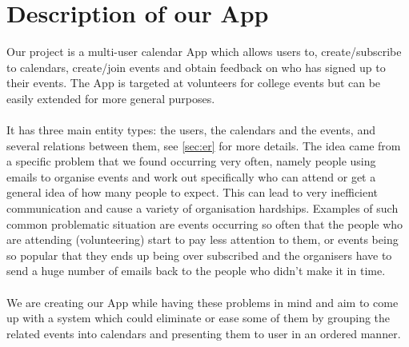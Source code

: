 \documentclass[10pt,a4paper]{article}
\begin{document}
\section{Description of our App}
Our project is a multi-user calendar App which allows users to, create/subscribe to calendars, create/join events and obtain feedback on who has signed up to their events. The App is targeted at volunteers for college events but can be easily extended for more general purposes.
\\
\\
\noindent
It has three main entity types: the users, the calendars and the events, and several relations between them, see \cref{sec:er} for more details. The idea came from a specific problem that we found occurring very often, namely people using emails to organise events and work out specifically who can attend or get a general idea of how many people to expect. This can lead to very inefficient communication and cause a variety of organisation hardships. Examples of such common problematic situation are events occurring so often that the people who are attending (volunteering) start to pay less attention to them, or events being so popular that they ends up being over subscribed and the organisers have to send a huge number of emails back to the people who didn't make it in time.
\\
\\
\noindent
We are creating our App while having these problems in mind and aim to come up with a system which could eliminate or ease some of them by grouping the related events into calendars and presenting them to user in an ordered manner.
\end{document}
